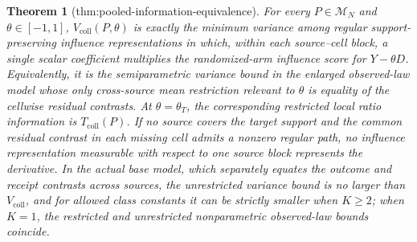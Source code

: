 \documentclass{article}
\newtheorem{theorem}{Theorem}
\begin{document}
\begin{theorem}[thm:pooled-information-equivalence]\label{thm:pooled-information-equivalence}
For every \(P\in\mathcal M_N\) and \(\theta\in[-1,1]\), \(V_{\mathrm{coll}}(P,\theta)\) is exactly the minimum variance among regular support-preserving influence representations in which, within each source--cell block, a single scalar coefficient multiplies the randomized-arm influence score for \(Y-\theta D\). Equivalently, it is the semiparametric variance bound in the enlarged observed-law model whose only cross-source mean restriction relevant to \(\theta\) is equality of the cellwise residual contrasts. At \(\theta=\theta_T\), the corresponding restricted local ratio information is \(T_{\mathrm{coll}}(P)\). If no source covers the target support and the common residual contrast in each missing cell admits a nonzero regular path, no influence representation measurable with respect to one source block represents the derivative. In the actual base model, which separately equates the outcome and receipt contrasts across sources, the unrestricted variance bound is no larger than \(V_{\mathrm{coll}}\), and for allowed class constants it can be strictly smaller when \(K\ge2\); when \(K=1\), the restricted and unrestricted nonparametric observed-law bounds coincide.
\end{theorem}
\end{document}
